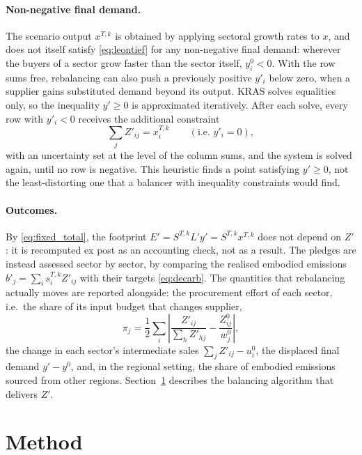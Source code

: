 \documentclass[11pt,a4paper]{article}
\begin{document}
\paragraph{Non-negative final demand.}
The scenario output $x^{T,k}$ is obtained by applying sectoral growth rates to $x$, and does not itself satisfy \eqref{eq:leontief} for any non-negative final demand: wherever the buyers of a sector grow faster than the sector itself, $y^0_i < 0$. With the row sums free, rebalancing can also push a previously positive $y'_i$ below zero, when a supplier gains substituted demand beyond its output. KRAS solves equalities only, so the inequality $y' \ge 0$ is approximated iteratively. After each solve, every row with $y'_i < 0$ receives the additional constraint
\begin{equation}\label{eq:rowcap}
  \sum_j Z'_{ij} = x^{T,k}_i \qquad (\text{i.e. } y'_i = 0),
\end{equation}
with an uncertainty set at the level of the column sums, and the system is solved again, until no row is negative. This heuristic finds a point satisfying $y' \ge 0$, not the least-distorting one that a balancer with inequality constraints would find.

\paragraph{Outcomes.}
By \eqref{eq:fixed_total}, the footprint $E' = S^{T,k} L' y' = S^{T,k} x^{T,k}$ does not depend on $Z'$: it is recomputed ex post as an accounting check, not as a result. The pledges are instead assessed sector by sector, by comparing the realised embodied emissions $b'_j = \sum_i s^{T,k}_i Z'_{ij}$ with their targets \eqref{eq:decarb}. The quantities that rebalancing actually moves are reported alongside: the procurement effort of each sector, i.e.\ the share of its input budget that changes supplier,
\begin{equation}\label{eq:effort}
  \pi_j = \frac{1}{2} \sum_i \left| \frac{Z'_{ij}}{\sum_h Z'_{hj}} - \frac{Z^0_{ij}}{w^0_j} \right| ,
\end{equation}
the change in each sector's intermediate sales $\sum_j Z'_{ij} - u^0_i$, the displaced final demand $y' - y^0$, and, in the regional setting, the share of embodied emissions sourced from other regions. Section~\ref{sec:method} describes the balancing algorithm that delivers $Z'$.

\section{Method}
\label{sec:method}
\end{document}

